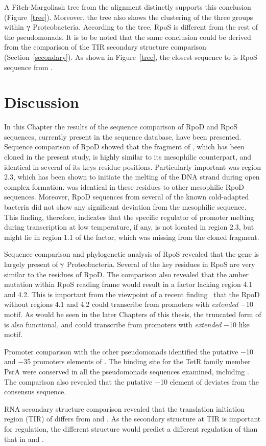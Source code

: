 A Fitch-Margoliash tree from the alignment distinctly supports
this conclusion (Figure~\ref{tree}). Moreover, the tree also shows
the clustering of the three groups within $\gammaup$
Proteobacteria. According to the tree,  RpoS is different
from the rest of the pseudomonads. It is to be noted that the same
conclusion could be derived from the comparison of the TIR
secondary structure comparison (Section~\ref{secondary}). As shown
in Figure~\ref{tree}, the closest sequence to \Lzsigs{} is RpoS
sequence from .


\section{Discussion}

In this Chapter the results of the sequence comparison of RpoD and
RpoS sequences, currently present in the sequence database, have
been presented. Sequence comparison of RpoD showed that the
fragment of \Lzsiga{}, which has been cloned in the present study,
is highly similar to its mesophilic counterpart, and identical in
several of its keys residue positions. Particularly important was
region 2.3, which has been shown to initiate the melting of the
DNA strand during open complex formation. \Lzsiga{} was identical
in these residues to other mesophilic RpoD sequences. Moreover,
RpoD sequences from several of the known cold-adapted bacteria did
not show any significant deviation from the mesophilic sequence.
This finding, therefore, indicates that the specific regulator of
promoter melting during transcription at low temperature, if any,
is not located in  region 2.3, but might lie in region 1.1 of the
\s{} factor, which was missing from the cloned fragment.

Sequence comparison and phylogenetic analysis of RpoS revealed
that the gene is largely present of $\gammaup$ Proteobacteria.
Several of the key residues in RpoS are very similar to the
residues of RpoD. The comparison also revealed that the amber
mutation within RpoS reading frame would result in a \s{} factor
lacking region 4.1 and 4.2. This is important from the viewpoint
of a recent finding~\citep{Campbell2002} that the  RpoD
without regions 4.1 and 4.2 could transcribe from promoters with
\emph{extended} $-$10 motif. As would be seen in the later
Chapters of this thesis, the truncated form of \Lzsigs{} is also
functional, and could transcribe from  promoters with
\emph{extended} $-$10 like motif.

Promoter comparison with the other pseudomonads identified the
putative $-$10 and $-$35 promoters elements of \lzsig{}. The
binding site for the TetR family member PsrA were conserved in all
the pseudomonads sequences examined, including \lzsig{}. The
comparison also revealed that the putative $-$10 element of
\lzsig{} deviates from the consensus sequence.

RNA secondary structure comparison revealed that the translation
initiation region (TIR) of \lzsig{} differs from  and
. As the secondary structure at TIR is important for
 regulation, the different structure would predict a
different regulation of \lzsig{} than that in  and
. 

